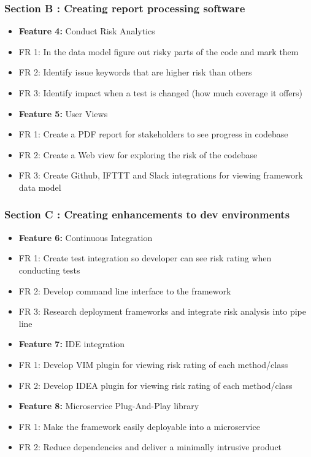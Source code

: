 \documentclass[11pt,]{article}
\begin{document}
\subsubsection{Section B : Creating report processing
software}\label{section-b-creating-report-processing-software}

\begin{itemize}
\item
  \textbf{Feature 4:} Conduct Risk Analytics
\item
  FR 1: In the data model figure out risky parts of the code and mark
  them
\item
  FR 2: Identify issue keywords that are higher risk than others
\item
  FR 3: Identify impact when a test is changed (how much coverage it
  offers)
\item
  \textbf{Feature 5:} User Views
\item
  FR 1: Create a PDF report for stakeholders to see progress in codebase
\item
  FR 2: Create a Web view for exploring the risk of the codebase
\item
  FR 3: Create Github, IFTTT and Slack integrations for viewing
  framework data model
\end{itemize}

\subsubsection{Section C : Creating enhancements to dev
environments}\label{section-c-creating-enhancements-to-dev-environments}

\begin{itemize}
\item
  \textbf{Feature 6:} Continuous Integration
\item
  FR 1: Create test integration so developer can see risk rating when
  conducting tests
\item
  FR 2: Develop command line interface to the framework
\item
  FR 3: Research deployment frameworks and integrate risk analysis into
  pipe line
\item
  \textbf{Feature 7:} IDE integration
\item
  FR 1: Develop VIM plugin for viewing risk rating of each method/class
\item
  FR 2: Develop IDEA plugin for viewing risk rating of each method/class
\item
  \textbf{Feature 8:} Microservice Plug-And-Play library
\item
  FR 1: Make the framework easily deployable into a microservice
\item
  FR 2: Reduce dependencies and deliver a minimally intrusive product
\end{itemize}
\end{document}
